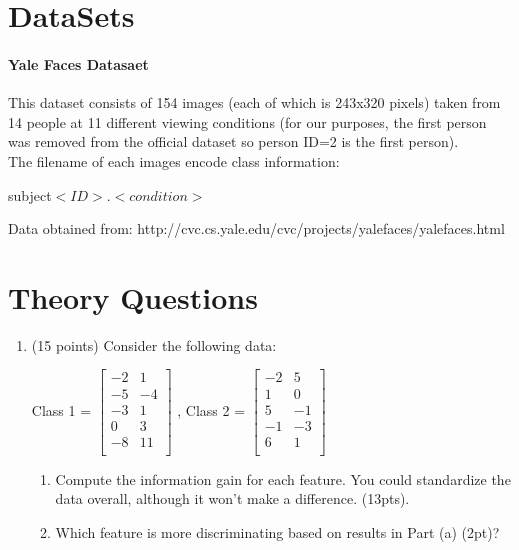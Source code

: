 \documentclass[12pt]{article}
\begin{document}
\section*{DataSets}

\paragraph{Yale Faces Datasaet}
This dataset consists of 154 images (each of which is 243x320 pixels) taken from 14 people at 11 different viewing conditions (for our purposes, the first person was removed from the official dataset so person ID=2 is the first person).\\

\noindent
The filename of each images encode class information:
\begin{center}
subject$<ID>$.$<condition>$
\end{center}
Data obtained from:  http://cvc.cs.yale.edu/cvc/projects/yalefaces/yalefaces.html

\newpage
\section{Theory Questions}
\begin{enumerate}


\item (15 points) Consider the following data:\\
\begin{center}
Class 1 =
$
 \begin{bmatrix}
	-2 & 1\\
	-5 & -4\\
	-3 & 1\\
	0 & 3\\
	-8 & 11\\

\end{bmatrix}
$
, Class 2 =
$
 \begin{bmatrix}
	-2 & 5\\
	1 & 0\\
	5 & -1\\
	-1 & -3\\
	6 & 1\\
\end{bmatrix}
$
\end{center}
	\begin{enumerate}
	\item Compute the information gain for each feature.  You could standardize the data overall, although it won't make a difference. (13pts).
	\item Which feature is more discriminating based on results in Part (a) (2pt)?
	\end{enumerate}

\end{enumerate}
\end{document}
